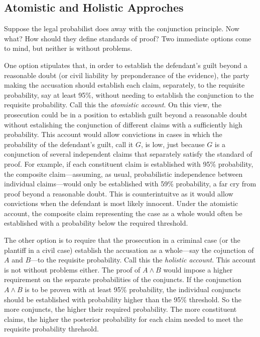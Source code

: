 \documentclass[10pt,dvipsnames,enabledeprecatedfontcommands]{scrartcl}
\newcommand{\et}{\wedge}
\begin{document}
\hypertarget{atomistic-and-holistic-approches}{%
\subsection{Atomistic and Holistic
Approches}\label{atomistic-and-holistic-approches}}

Suppose the legal probabilist does away with the conjunction principle.
Now what? How should they define standards of proof? Two immediate
options come to mind, but neither is without problems.

One option stipulates that, in order to establish the defendant's guilt
beyond a reasonable doubt (or civil liability by preponderance of the
evidence), the party making the accusation should establish each claim,
separately, to the requisite probability, say at least 95\%, without
needing to establish the conjunction to the requisite probability. Call
this the \textit{atomistic account}. On this view, the prosecution could
be in a position to establish guilt beyond a reasonable doubt without
estalishing the conjunction of different claims with a sufficiently high
probability. This account would allow convictions in cases in which the
probability of the defendant's guilt, call it \(G\), is low, just
because \(G\) is a conjunction of several independent claims that
separately satisfy the standard of proof. For example, if each
constituent claim is established with 95\% probability, the composite
claim---assuming, as usual, probabilistic independence between
individual claims---would only be established with 59\% probability, a
far cry from proof beyond a reasonable doubt. This is counterintuitve as
it would allow convictions when the defendant is most likely innocent.
Under the atomistic account, the composite claim representing the case
as a whole would often be established with a probability below the
required threshold.

The other option is to require that the prosecution in a criminal case
(or the plantiff in a civil case) establish the accusation as a
whole---say the cojunction of \(A\) and \(B\)---to the requisite
probability. Call this the \textit{holistic account}. This account is
not without problems either. The proof of \(A\et B\) would impose a
higher requirement on the separate probabilities of the conjuncts. If
the conjunction \(A\et B\) is to be proven with at least 95\%
probability, the individual conjuncts should be established with
probability higher than the 95\% threshold. So the more conjuncts, the
higher their required probability. The more constituent claims, the
higher the posterior probability for each claim needed to meet the
requisite probability threhsold.
\end{document}
